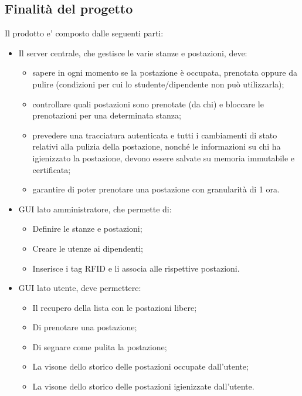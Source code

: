 \subsection{Finalità del progetto}
Il prodotto e' composto dalle seguenti parti:
\begin{itemize}
\item Il server centrale, che gestisce le varie stanze e postazioni, deve:
\begin{itemize}
\item sapere in ogni momento se la postazione è occupata, prenotata oppure da pulire (condizioni per cui
lo studente/dipendente non può utilizzarla);
\item controllare quali postazioni sono prenotate (da chi) e bloccare le prenotazioni per una determinata stanza;
\item prevedere una tracciatura autenticata e tutti i cambiamenti di stato relativi alla pulizia della
postazione, nonché le informazioni su chi ha igienizzato la postazione, devono essere salvate su
memoria immutabile e certificata;
\item garantire di poter prenotare una postazione con granularità di 1 ora.
\end{itemize}
\item GUI lato amministratore, che permette di:
\begin{itemize}
\item Definire le stanze e postazioni;
\item Creare le utenze ai dipendenti;
\item Inserisce i tag RFID e li associa alle rispettive postazioni.
\end{itemize}
\item GUI lato utente, deve permettere:
\begin{itemize}
\item Il recupero della lista con le postazioni libere;
\item Di prenotare una postazione;
\item Di segnare come pulita la postazione;
\item La visone dello storico delle postazioni occupate dall'utente;
\item La visone dello storico delle postazioni igienizzate dall'utente.
\end{itemize}
\end{itemize}

